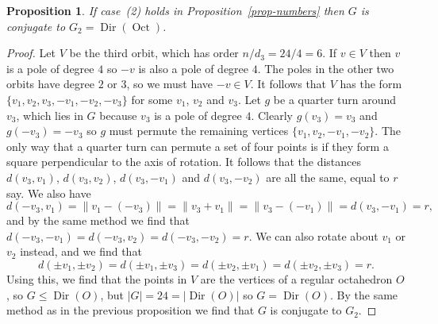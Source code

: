 \documentclass{amsart}
\DeclareMathOperator{\Oct}      {Oct}
\DeclareMathOperator{\Dir}      {Dir}
\renewcommand{\:}{\colon}
\newtheorem{proposition}[theorem]{Proposition}
\theoremstyle{definition}
\begin{document}
\begin{proposition}\label{prop-class-oct}
 If case~(2) holds in Proposition~\ref{prop-numbers} then $G$ is
 conjugate to $G_2=\Dir(\Oct)$.
\end{proposition}
\begin{proof}
 Let $V$ be the third orbit, which has order $n/d_3=24/4=6$.  If
 $v\in V$ then $v$ is a pole of degree $4$ so $-v$ is also a pole of
 degree $4$.  The poles in the other two orbits have degree $2$ or
 $3$, so we must have $-v\in V$.  It follows that $V$ has the form
 $\{v_1,v_2,v_3,-v_1,-v_2,-v_3\}$ for some $v_1$, $v_2$ and $v_3$.
 Let $g$ be a quarter turn around $v_3$, which lies in $G$ because
 $v_3$ is a pole of degree $4$.  Clearly $g(v_3)=v_3$ and
 $g(-v_3)=-v_3$ so $g$ must permute the remaining vertices
 $\{v_1,v_2,-v_1,-v_2\}$.  The only way that a quarter turn can
 permute a set of four points is if they form a square perpendicular
 to the axis of rotation.  It follows that the distances $d(v_3,v_1)$,
 $d(v_3,v_2)$, $d(v_3,-v_1)$ and $d(v_3,-v_2)$ are all the same, equal
 to $r$ say.  We also have
 \[ d(-v_3,v_1)=\|v_1-(-v_3)\|=
    \|v_3+v_1\|=\|v_3-(-v_1)\|=d(v_3,-v_1)=r,
 \]
 and by the same method we find that
 $d(-v_3,-v_1)=d(-v_3,v_2)=d(-v_3,-v_2)=r$.  We can also rotate about
 $v_1$ or $v_2$ instead, and we find that
 \[
  d(\pm v_1,\pm v_2) = d(\pm v_1,\pm v_3) = 
  d(\pm v_2,\pm v_1) = d(\pm v_2,\pm v_3) = r.
 \]
 Using this, we find that the points in $V$ are the vertices of a
 regular octahedron $O$, so $G\leq\Dir(O)$, but $|G|=24=|\Dir(O)|$ so
 $G=\Dir(O)$.  By the same method as in the previous proposition we
 find that $G$ is conjugate to $G_2$.
\end{proof}
\end{document}
